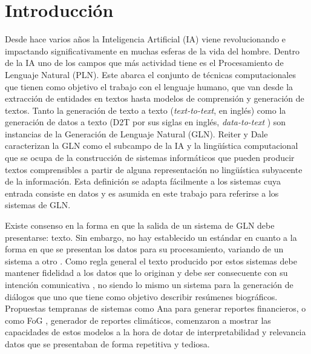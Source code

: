 \chapter*{Introducción}\label{chapter:introduction}

    Desde hace varios años la Inteligencia Artificial (IA) viene revolucionando e \\impactando significativamente en muchas esferas de la 
vida del hombre. Dentro de la IA uno de los campos que más actividad tiene es el Procesamiento de Lenguaje Natural (PLN). Este abarca el conjunto de 
t\'ecnicas computacionales que tienen como objetivo el trabajo con el lenguaje humano, que van desde la extracci\'on de entidades en textos hasta modelos 
de comprensi\'on y generación de textos. Tanto la generación de texto a texto (\emph{text-to-text}, en inglés) como la generación de 
datos a texto (D2T por sus siglas en inglés, \emph{data-to-text} ) son instancias de la Generación de Lenguaje Natural (GLN). Reiter y Dale  
caracterizan la GLN como el subcampo de la IA y la lingüística computacional que se ocupa de la construcción de sistemas informáticos que pueden 
producir textos comprensibles a partir de alguna representación no lingüística subyacente de la información. 
Esta definición se adapta fácilmente a los sistemas cuya entrada consiste en datos y es asumida en este trabajo para referirse a los sistemas de GLN. 
    
    
    Existe consenso en la forma en que la salida de un sistema de GLN debe presentarse: texto. Sin embargo, no hay establecido un est\'andar en cuanto a la forma en 
que se presentan los datos para su procesamiento, variando de un sistema a otro . Como regla general el texto producido por estos sistemas 
debe mantener fidelidad a los datos que lo originan y debe ser consecuente con su intención comunicativa , no siendo lo mismo un 
sistema para la generación de diálogos que uno que tiene como objetivo describir resúmenes biográficos. Propuestas tempranas de sistemas como Ana  para 
generar reportes financieros, o como FoG , generador de reportes climáticos, comenzaron a mostrar las capacidades de estos 
modelos a la hora de dotar de interpretabilidad y relevancia datos que se presentaban de forma repetitiva y tediosa.
  
